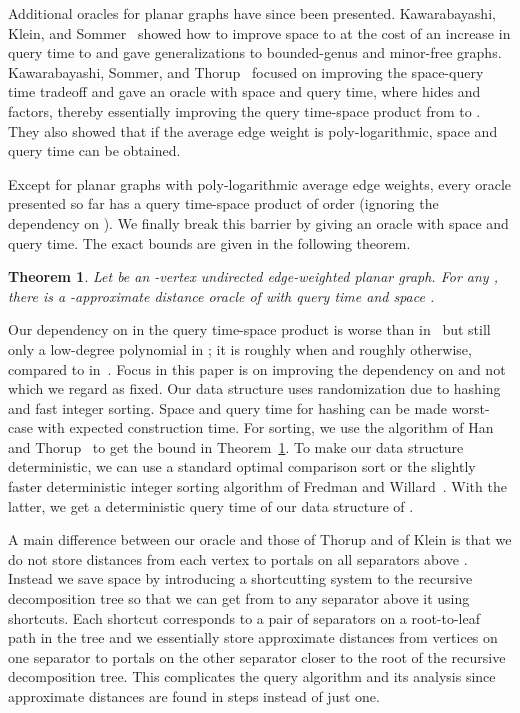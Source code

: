\documentclass[11pt]{article}
\newtheorem{theorem}{Theorem}
\begin{document}
Additional oracles for planar graphs have since been presented. Kawarabayashi, Klein, and Sommer~\cite{LinSpaceOraclesPlanar} showed how to improve space to  at the cost of an increase in query time to  and gave generalizations to bounded-genus and minor-free graphs. Kawarabayashi, Sommer, and Thorup~\cite{CompactOraclesPlanar} focused on improving the space-query time tradeoff and gave an oracle with  space and  query time, where  hides  and  factors, thereby essentially improving the query time-space product from  to . They also showed that if the average edge weight is poly-logarithmic,  space and  query time can be obtained.

Except for planar graphs with poly-logarithmic average edge weights, every oracle presented so far has a query time-space product of order  (ignoring the dependency on ). We finally break this barrier by giving an oracle with  space and  query time. The exact bounds are given in the following theorem.
\begin{theorem}\label{Thm:Main}
Let  be an -vertex undirected edge-weighted planar graph. For any , there is a -approximate distance oracle of  with query time  and space .
\end{theorem}
Our dependency on  in the query time-space product is worse than in~\cite{OraclePlanarKlein, OraclePlanarThorup} but still only a low-degree polynomial in ; it is roughly  when  and roughly  otherwise, compared to  in~\cite{OraclePlanarKlein, OraclePlanarThorup}. Focus in this paper is on improving the dependency on  and not  which we regard as fixed. Our data structure uses randomization due to hashing and fast integer sorting. Space and query time for hashing can be made worst-case with expected construction time. For sorting, we use the algorithm of Han and Thorup~\cite{IntegerSorting} to get the bound in Theorem~\ref{Thm:Main}. To make our data structure deterministic, we can use a standard optimal comparison sort or the slightly faster deterministic integer sorting algorithm of Fredman and Willard~\cite{DetIntSorting}. With the latter, we get a deterministic query time of our data structure of .

A main difference between our oracle and those of Thorup and of Klein is that we do not store distances from each vertex  to portals on all  separators above . Instead we save space by introducing a shortcutting system to the recursive decomposition tree so that we can get from  to any separator above it using  shortcuts. Each shortcut corresponds to a pair of separators on a root-to-leaf path in the tree and we essentially store approximate distances from vertices on one separator to portals on the other separator closer to the root of the recursive decomposition tree. This complicates the query algorithm and its analysis since approximate distances are found in  steps instead of just one.
\end{document}
